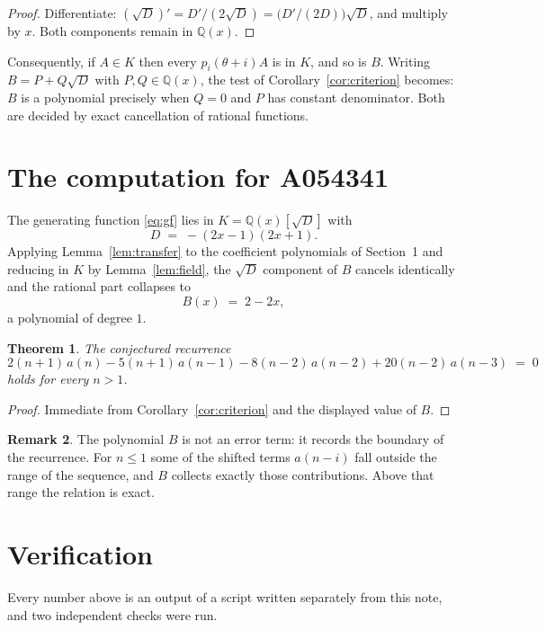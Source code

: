 \documentclass[11pt,a4paper]{article}
\theoremstyle{plain}
\newtheorem{theorem}{Theorem}
\theoremstyle{definition}
\newtheorem{remark}[theorem]{Remark}
\begin{document}
\begin{proof}
Differentiate: $(\sqrt{D})'=D'/(2\sqrt{D})=\bigl(D'/(2D)\bigr)\sqrt{D}$, and multiply by
$x$. Both components remain in $\mathbb{Q}(x)$.
\end{proof}

Consequently, if $A\in K$ then every $p_{i}(\theta+i)A$ is in $K$, and so is $B$. Writing
$B=P+Q\sqrt{D}$ with $P,Q\in\mathbb{Q}(x)$, the test of Corollary~\ref{cor:criterion}
becomes: $B$ is a polynomial precisely when $Q=0$ and $P$ has constant denominator. Both
are decided by exact cancellation of rational functions.

\section{The computation for A054341}

The generating function \eqref{eq:gf} lies in $K=\mathbb{Q}(x)[\sqrt{D}]$ with
\[
D \;=\; - \left(2 x - 1\right) \left(2 x + 1\right) .
\]
Applying Lemma~\ref{lem:transfer} to the coefficient polynomials of Section~1 and reducing
in $K$ by Lemma~\ref{lem:field}, the $\sqrt{D}$ component of $B$ cancels identically and
the rational part collapses to
\[
B(x)\;=\;2 - 2 x ,
\]
a polynomial of degree $1$.

\begin{theorem}
The conjectured recurrence
\[
2 \left(n + 1\right)\,a(n) -  5 \left(n + 1\right)\,a(n-1) -  8 \left(n - 2\right)\,a(n-2) + 20 \left(n - 2\right)\,a(n-3) \;=\;0
\]
holds for every $n>1$.
\end{theorem}

\begin{proof}
Immediate from Corollary~\ref{cor:criterion} and the displayed value of $B$.
\end{proof}

\begin{remark}
The polynomial $B$ is not an error term: it records the boundary of the recurrence. For
$n\le1$ some of the shifted terms $a(n-i)$ fall outside the range of the sequence,
and $B$ collects exactly those contributions. Above that range the relation is exact.
\end{remark}

\section{Verification}

Every number above is an output of a script written separately from this note, and two
independent checks were run.
\end{document}
